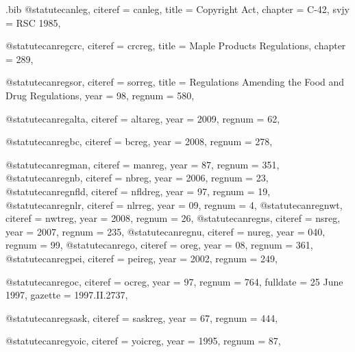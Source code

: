 \begin{filecontents*}{\jobname.bib}
@statute{canleg,
citeref = {canleg},
title = {Copyright Act},
chapter = {C-42},
svjy = {RSC 1985},
}

@statute{canregcrc,
citeref = {crcreg},
title = {Maple Products Regulations},
chapter = {289},
}


@statute{canregsor,
citeref = {sorreg},
title = {Regulations Amending the Food and Drug Regulations},
year = {98},
regnum = {580},
}

@statute{canregalta,
citeref = {altareg},
year = {2009},
regnum = {62},
}

@statute{canregbc,
citeref = {bcreg},
year = {2008},
regnum = {278},
}

@statute{canregman,
citeref = {manreg},
year = {87},
regnum = {351},
}
@statute{canregnb,
citeref = {nbreg},
year = {2006},
regnum = {23},
}
@statute{canregnfld,
citeref = {nfldreg},
year = {97},
regnum = {19},
}
@statute{canregnlr,
citeref = {nlrreg},
year = {09},
regnum = {4},
}
@statute{canregnwt,
citeref = {nwtreg},
year = {2008},
regnum = {26},
}
@statute{canregns,
citeref = {nsreg},
year = {2007},
regnum = {235},
}
@statute{canregnu,
citeref = {nureg},
year = {040},
regnum = {99},
}
@statute{canrego,
citeref = {oreg},
year = {08},
regnum = {361},
}
@statute{canregpei,
citeref = {peireg},
year = {2002},
regnum = {249},
}

@statute{canregoc,
citeref = {ocreg},
year = {97},
regnum = {764},
fulldate = {25 June 1997},
gazette = {1997.II.2737},
}

@statute{canregsask,
citeref = {saskreg},
year = {67},
regnum = {444},
}

@statute{canregyoic,
citeref = {yoicreg},
year = {1995},
regnum = {87},
}

\end{filecontents*}



\documentclass[12pt]{article}
\newcommand\rulesep{\rule{0.4\textwidth}{.4pt}}
\usepackage[table]{xcolor}
\pagecolor{blue!3}
\usepackage{fontspec}
\setmainfont{Noto Serif}
\setsansfont{Noto Sans}[Scale=0.8]
\setmonofont{Noto Sans Mono}%

